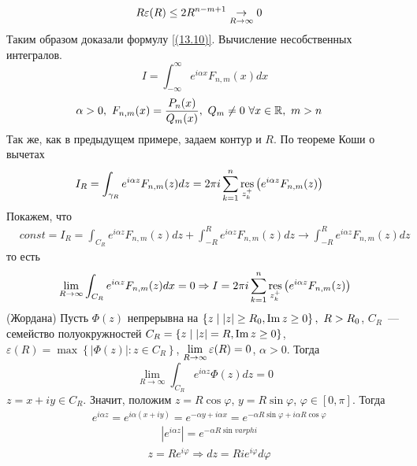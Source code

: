 \begin{align*}
  & R\varepsilon(R) \leq 2R^{n-m+1} \underset{R \to \infty}{\to} 0
\end{align*}
Таким образом доказали формулу \eqref{(13.10)}.
\Example
Вычисление несобственных интегралов.
\begin{equation}\label{(13.11)}
    I = \int_{-\infty}^{\infty}e^{i\alpha x}F_{n,m}(x)dx
\end{equation}
\begin{align*}
  & \alpha > 0, \ F_{n,m}(x) = \frac{P_n(x)}{Q_m(x)}, \ Q_m \neq 0 \ \forall x \in \mathbb{R}, \ m > n
\end{align*}
Так же, как в предыдущем примере, задаем контур и $R$. По теореме Коши о вычетах
\begin{align*}
  & I_R = \int_{\gamma_R}e^{i\alpha z}F_{n,m}(z) dz = 2 \pi i \sum_{k=1}^n\underset{z_k^+}{\mathrm{res}}\left( e^{i\alpha z} F_{n,m}(z)\right)
\end{align*}
Покажем, что
\begin{align*}
  & const = I_R = \int_{C_R}e^{i\alpha z}F_{n,m}(z) dz + \int_{-R}^Re^{i\alpha z}F_{n,m}(z) dz \to \int_{-R}^Re^{i\alpha z}F_{n,m}(z) dz
\end{align*}
то есть
\begin{equation}\label{(13.12)}
    \lim_{R \to \infty} \int_{C_R}e^{i\alpha z}F_{n,m}(z)dx = 0 \Rightarrow I = 2 \pi i \sum_{k=1}^n \underset{z_k^+}{\mathrm{res}}\left( e^{i \alpha z}F_{n,m}(z) \right)
\end{equation}
\lemma (Жордана)
Пусть $\Phi(z)$ непрерывна на $\left\{ z \mid \left| z \right| \geq R_0, \mathrm{Im}\, z
    \geq 0 \right\}, \ R > R_0$, $C_R$~--- семейство полуокружностей $C_R = \{z
\mid \left| z \right| = R, \mathrm{Im}\, z \geq 0\}$, $ \varepsilon(R) = \max \left\{
    \left| \Phi(z) \right| : z \in C_R \right\}$, $ \displaystyle \lim_{R \to \infty}
\varepsilon(R) = 0$, $\alpha > 0$. Тогда
\begin{equation}\label{(13.13)}
    \lim_{R \to \infty}\int_{C_R}e^{i \alpha z}\Phi(z)dz = 0
\end{equation}
\pr
$z = x + iy \in C_R$. Значит, положим $z = R \cos \varphi$, $y = R \sin \varphi$,
$ \varphi \in [0,\pi]$. Тогда
\begin{align*}
  & e^{i \alpha z} = e^{i \alpha(x+iy)} = e^{-\alpha y + i \alpha x} = e^{-\alpha R \sin \varphi + i \alpha R \cos \varphi}
\end{align*}
\begin{align*}
  & \left| e^{i \alpha z} \right| = e^{-\alpha R \sin varphi}
\end{align*}
\begin{align*}
  & z = R e^{i \varphi} \Rightarrow dz = R i e^{i \varphi} d \varphi
\end{align*}
